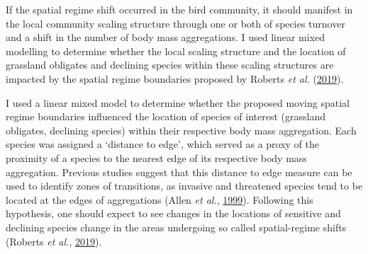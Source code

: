 \documentclass[12pt,twoside,openany]{reedthesis}
\begin{document}
If the spatial regime shift occurred in the bird community, it should manifest in the local community scaling structure through one or both of species turnover and a shift in the number of body mass aggregations. I used linear mixed modelling to determine whether the local scaling structure and the location of grassland obligates and declining species within these scaling structures are impacted by the spatial regime boundaries proposed by Roberts \emph{et al.} (\protect\hyperlink{ref-roberts2019shifting}{2019}).

I used a linear mixed model to determine whether the proposed moving spatial regime boundaries influenced the location of species of interest (grassland obligates, declining species) within their respective body mass aggregation. Each species was assigned a `distance to edge', which served as a proxy of the proximity of a species to the nearest edge of its respective body mass aggregation. Previous studies suggest that this distance to edge measure can be used to identify zones of transitions, as invasive and threatened species tend to be located at the edges of aggregations (Allen \emph{et al.}, \protect\hyperlink{ref-allen1999body}{1999}). Following this hypothesis, one should expect to see changes in the locations of sensitive and declining species change in the areas undergoing so called spatial-regime shifts (Roberts \emph{et al.}, \protect\hyperlink{ref-roberts2019shifting}{2019}).
\end{document}
